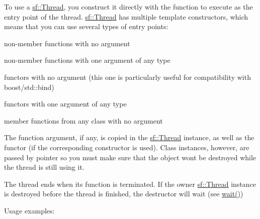 To use a \mbox{\hyperlink{classsf_1_1_thread}{sf\+::\+Thread}}, you construct it directly with the function to execute as the entry point of the thread. \mbox{\hyperlink{classsf_1_1_thread}{sf\+::\+Thread}} has multiple template constructors, which means that you can use several types of entry points\+: \begin{DoxyItemize}
\item non-\/member functions with no argument \item non-\/member functions with one argument of any type \item functors with no argument (this one is particularly useful for compatibility with boost/std\+:\+:bind) \item functors with one argument of any type \item member functions from any class with no argument\end{DoxyItemize}
The function argument, if any, is copied in the \mbox{\hyperlink{classsf_1_1_thread}{sf\+::\+Thread}} instance, as well as the functor (if the corresponding constructor is used). Class instances, however, are passed by pointer so you must make sure that the object won\textquotesingle{}t be destroyed while the thread is still using it.

The thread ends when its function is terminated. If the owner \mbox{\hyperlink{classsf_1_1_thread}{sf\+::\+Thread}} instance is destroyed before the thread is finished, the destructor will wait (see \mbox{\hyperlink{classsf_1_1_thread_a724b1f94c2d54f84280f2f78bde95fa0}{wait()}})

Usage examples\+: 
\begin{DoxyCode}{0}
\DoxyCodeLine{\textcolor{comment}{// example 1: non member function with one argument}}
\DoxyCodeLine{}
\DoxyCodeLine{\{}
\DoxyCodeLine{\}}
\DoxyCodeLine{}
\end{DoxyCode}



\begin{DoxyCode}{0}
\DoxyCodeLine{\textcolor{comment}{// example 2: member function}}
\DoxyCodeLine{}
\DoxyCodeLine{\{}
\DoxyCodeLine{\textcolor{keyword}{public}:}
\DoxyCodeLine{    \{}
\DoxyCodeLine{    \}}
\DoxyCodeLine{\};}
\DoxyCodeLine{}
\end{DoxyCode}



